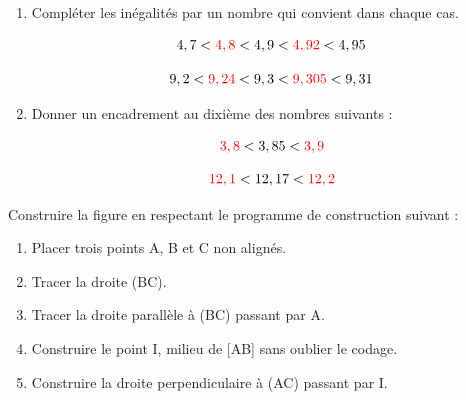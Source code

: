 \documentclass[a4paper]{book}
\begin{document}
{\begin{exercice}
\begin{enumerate}[leftmargin=*]
\begin{minipage}{0.23\linewidth}
                \medskip

                donc $15 + \frac{3}{10} = \frac{153}{10}$
            \end{minipage}  

            \item Compléter les inégalités par un nombre qui convient dans chaque cas.

            \begin{center}
                \begin{minipage}{0.40\linewidth}
                    \[4,7 < \textcolor{red}{4,8} < 4,9 < \textcolor{red}{4,92} < 4,95\]
                \end{minipage}
                \hfill \vline \hfill
                \begin{minipage}{0.40\linewidth}
                    \[9,2 < \textcolor{red}{9,24} < 9,3 < \textcolor{red}{9,305} < 9,31\]
                \end{minipage}
            \end{center}

            \item Donner un encadrement au dixième des nombres suivants :

            \begin{center}
                \begin{minipage}{0.40\linewidth}
                    \[\textcolor{red}{3,8} < 3,85 < \textcolor{red}{3,9}\]
                \end{minipage}
                \hfill \vline \hfill
                \begin{minipage}{0.40\linewidth}
                    \[\textcolor{red}{12,1} < 12,17 < \textcolor{red}{12,2}\]
                \end{minipage}
            \end{center}            
        \end{enumerate}
    \end{exercice}


    \begin{exercice}
        Construire la figure en respectant le programme de construction suivant : 

        \begin{enumerate}
            \item Placer trois points A, B et C non alignés.
            \item Tracer la droite (BC).
            \item Tracer la droite parallèle à (BC) passant par A.
            \item Construire le point I, milieu de [AB] sans oublier le codage.
            \item Construire la droite perpendiculaire à (AC) passant par I.
        \end{enumerate}


\end{exercice}}
\end{document}
